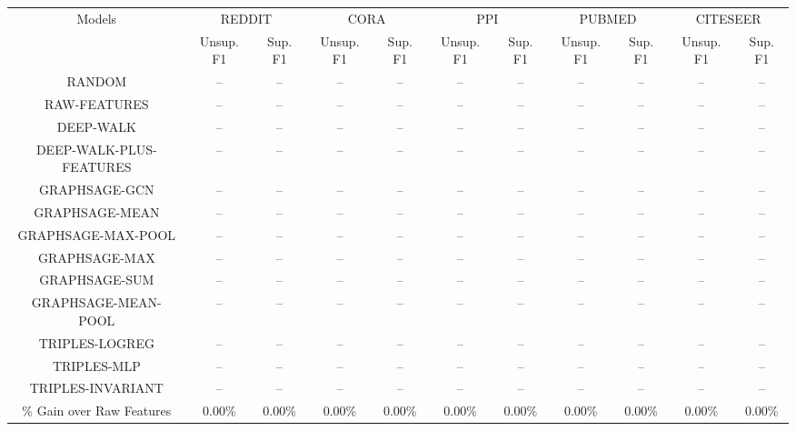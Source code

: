 \begin{tabular}{ccccccccccc}
    \hline
    \multirow{2}{*}{ Models } &
    	\multicolumn{2}{c}{ REDDIT } & 	\multicolumn{2}{c}{ CORA } & 	\multicolumn{2}{c}{ PPI } & 	\multicolumn{2}{c}{ PUBMED } & 	\multicolumn{2}{c}{ CITESEER } \\

    
    \cline { 2 - 11 } &
         Unsup. F1 & Sup. F1 &  Unsup. F1 & Sup. F1 &  Unsup. F1 & Sup. F1 &  Unsup. F1 & Sup. F1 &  Unsup. F1 & Sup. F1  \\
    
    \hline
    	RANDOM & -- & -- & -- & -- & -- & -- & -- & -- & -- & -- \\
	RAW-FEATURES & -- & -- & -- & -- & -- & -- & -- & -- & -- & -- \\
	DEEP-WALK & -- & -- & -- & -- & -- & -- & -- & -- & -- & -- \\
	DEEP-WALK-PLUS-FEATURES & -- & -- & -- & -- & -- & -- & -- & -- & -- & -- \\
	GRAPHSAGE-GCN & -- & -- & -- & -- & -- & -- & -- & -- & -- & -- \\
	GRAPHSAGE-MEAN & -- & -- & -- & -- & -- & -- & -- & -- & -- & -- \\
	GRAPHSAGE-MAX-POOL & -- & -- & -- & -- & -- & -- & -- & -- & -- & -- \\
	GRAPHSAGE-MAX & -- & -- & -- & -- & -- & -- & -- & -- & -- & -- \\
	GRAPHSAGE-SUM & -- & -- & -- & -- & -- & -- & -- & -- & -- & -- \\
	GRAPHSAGE-MEAN-POOL & -- & -- & -- & -- & -- & -- & -- & -- & -- & -- \\
	TRIPLES-LOGREG & -- & -- & -- & -- & -- & -- & -- & -- & -- & -- \\
	TRIPLES-MLP & -- & -- & -- & -- & -- & -- & -- & -- & -- & -- \\
	TRIPLES-INVARIANT & -- & -- & -- & -- & -- & -- & -- & -- & -- & -- \\

    
    \hline
    \% Gain over Raw Features & 0.00\% & 0.00\% & 0.00\% & 0.00\% & 0.00\% & 0.00\% & 0.00\% & 0.00\% & 0.00\% & 0.00\% \\
    \hline
    \end{tabular}